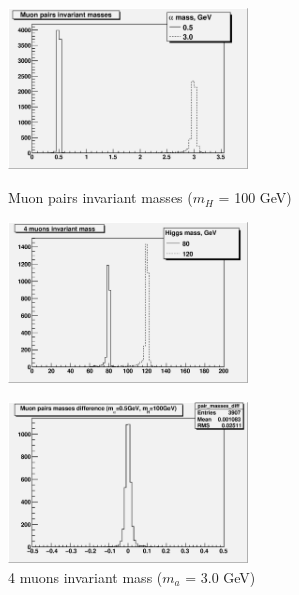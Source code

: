 \documentclass[aps,prd,onecolumn,superscriptaddress,showpacs]{revtex4}
\begin{document}
\begin{figure}[htb]
\begin{center}
\includegraphics[width=15pc]{plots/muon_pairs_masses.eps}
\caption{Muon pairs invariant masses ($m_H$ = 100 GeV)}
\label{muon_pairs_masses}
\includegraphics[width=15pc]{plots/invariant_mass.eps}
\caption{4 muons invariant mass ($m_a$ = 3.0 GeV)}
\label{invariant_mass}
\includegraphics[width=15pc]{plots/pairs_masses_diff_0.5.eps}

\end{center}
\end{figure}
\end{document}
